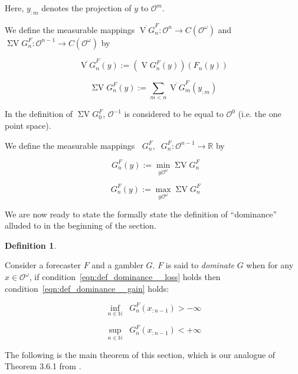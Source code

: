\documentclass[11pt]{article}
\theoremstyle{definition}
\newtheorem{definition}{Definition}%
\theoremstyle{plain}
\newcommand{\Nats}{\mathbb{N}}
\newcommand{\Reals}{\mathbb{R}}
\newcommand{\Ob}{\mathcal{O}}
\newcommand{\OO}{\Ob^\omega}
\newcommand{\CO}{C(\OO)}
\DeclareMathOperator{\V}{V}
\DeclareMathOperator{\SV}{\Sigma V}
\DeclareMathOperator{\SVM}{\Sigma V_{\min}}
\DeclareMathOperator{\SVX}{\Sigma V_{\max}}
\begin{document}
Here, $y_{:m}$ denotes the projection of $y$ to $\Ob^m$.

We define the measurable mappings $\overline{\V G}^F_n: \Ob^n \rightarrow \CO$ and $\SV G^F_n: \Ob^{n-1} \rightarrow \CO$ by

\begin{equation}
\overline{\V G}^F_n(y):=(\V G^F_n(y))(F_n(y))
\end{equation}

\begin{equation}
\SV G^F_n(y) := \sum_{m < n} \overline{\V G}^F_m(y_{:m})
\end{equation}

In the definition of $\SV G^F_0$, $\Ob^{-1}$ is considered to be equal to $\Ob^0$ (i.e. the one point space).

We define the measurable mappings $\SVM G^F_n, \SVX G^F_n: \Ob^{n-1} \rightarrow \Reals$ by

\begin{equation}
\SVM G^F_n(y):=\min_{y\OO} \SV G^F_n
\end{equation}

\begin{equation}
\SVX G^F_n(y):=\max_{y\OO} \SV G^F_n
\end{equation}

We are now ready to state the formally state the definition of \enquote{dominance} alluded to in the beginning of the section.

\begin{definition}
\label{def:dominance}

Consider a forecaster $F$ and a gambler $G$. $F$ is said to \emph{dominate} $G$ when for any $x \in \OO$, if condition~\ref{eqn:def_dominance__loss} holds then condition~\ref{eqn:def_dominance__gain} holds:

\begin{equation}
\label{eqn:def_dominance__loss}
\inf_{n \in \Nats} {\SVM G^F_{n}(x_{:n-1})} > -\infty
\end{equation}

\begin{equation}
\label{eqn:def_dominance__gain}
\sup_{n \in \Nats} {\SVX G^F_{n}(x_{:n-1})} < +\infty
\end{equation}

\end{definition}

The following is the main theorem of this section, which is our analogue of Theorem 3.6.1 from \cite{Garrabrant_2016}.
\end{document}

